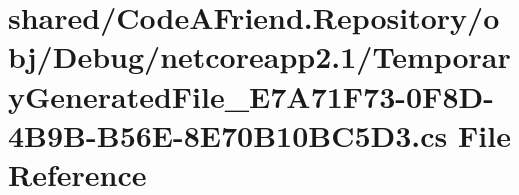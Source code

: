 \hypertarget{shared_2_code_a_friend_8_repository_2obj_2_debug_2netcoreapp2_81_2_temporary_generated_file___e76058697e214430e83d9dc6971d40f9b7}{}\section{shared/\+Code\+A\+Friend.Repository/obj/\+Debug/netcoreapp2.1/\+Temporary\+Generated\+File\+\_\+\+E7\+A71\+F73-\/0\+F8\+D-\/4\+B9\+B-\/\+B56\+E-\/8\+E70\+B10\+B\+C5\+D3.cs File Reference}
\label{shared_2_code_a_friend_8_repository_2obj_2_debug_2netcoreapp2_81_2_temporary_generated_file___e76058697e214430e83d9dc6971d40f9b7}

